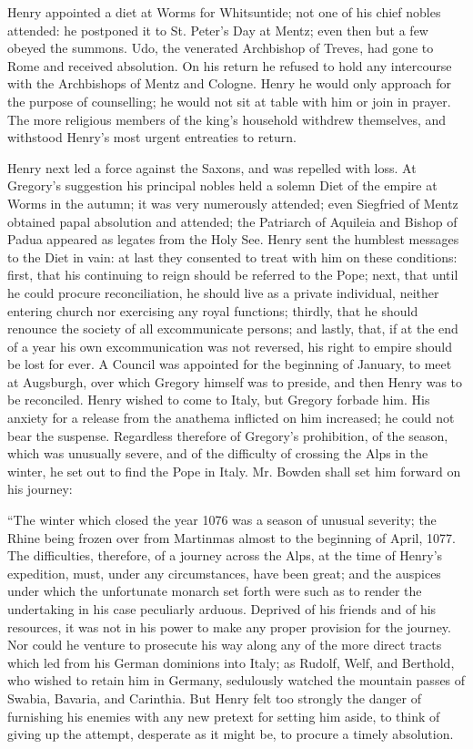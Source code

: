 Henry appointed a diet at Worms for Whitsuntide;
not one of his chief nobles attended: he postponed it to St. Peter's
Day at Mentz; even then but a few obeyed the summons. Udo, the
venerated Archbishop of Treves, had gone to Rome and received
absolution. On his return he refused to hold any intercourse with the
Archbishops of Mentz and Cologne. Henry he would only approach for the
purpose of counselling; he would not sit at table with him or join in
prayer. The more religious members of the king's household withdrew
themselves, and withstood Henry's most urgent entreaties to return.

Henry next led a force against the Saxons, and
was repelled with loss. At Gregory's suggestion his principal nobles
held a solemn Diet of the empire at Worms in the autumn; it was very
numerously attended; even Siegfried of Mentz obtained papal absolution
and attended; the Patriarch of Aquileia and Bishop of Padua appeared
as legates from the Holy See. Henry sent the humblest messages
to the Diet in vain: at last they consented to treat with him on these
conditions: first, that his continuing to reign should be referred to
the Pope; next, that until he could procure reconciliation, he should
live as a private individual, neither entering church nor exercising
any royal functions; thirdly, that he should renounce the society of
all excommunicate persons; and lastly, that, if at the end of a year
his own excommunication was not reversed, his right to empire should
be lost for ever. A Council was appointed for the beginning of
January, to meet at Augsburgh, over which Gregory himself was to
preside, and then Henry was to be reconciled. Henry wished to come to
Italy, but Gregory forbade him. His anxiety for a release from the
anathema inflicted on him increased; he could not bear the suspense.
Regardless therefore of Gregory's prohibition, of the season, which
was unusually severe, and of the difficulty of crossing the Alps in
the winter, he set out to find the Pope in Italy. Mr. Bowden shall set
him forward on his journey:

``The
winter which closed the year 1076 was a season of unusual severity;
the Rhine being frozen over from Martinmas almost to the beginning of
April, 1077. The difficulties, therefore, of a journey across the
Alps, at the time of Henry's expedition, must, under any
circumstances, have been great; and the auspices under which the
unfortunate monarch set forth were such as to render the undertaking
in his case peculiarly arduous. Deprived of his friends and of his
resources, it was not in his power to make any proper provision for
the journey. Nor could he venture to prosecute his way along any of
the more direct tracts which led from his German dominions into Italy;
as Rudolf, Welf, and Berthold, who wished to retain him in Germany,
sedulously watched the mountain passes of Swabia, Bavaria, and
Carinthia. But Henry felt too strongly the danger of furnishing his
enemies with any new pretext for setting him aside, to think of giving
up the attempt, desperate as it might be, to procure a timely
absolution.

